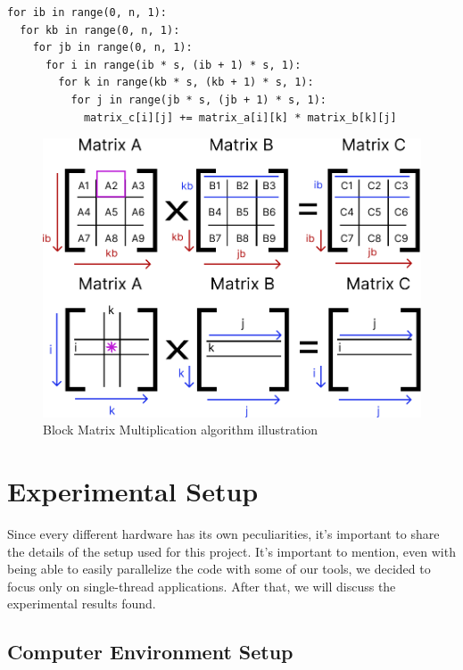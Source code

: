\documentclass[sigconf,balance,nonacm]{acmart}
\begin{document}
\begin{minipage}{\linewidth}
    \begin{lstlisting}
for ib in range(0, n, 1):
  for kb in range(0, n, 1):
    for jb in range(0, n, 1):
      for i in range(ib * s, (ib + 1) * s, 1):
    	for k in range(kb * s, (kb + 1) * s, 1):
          for j in range(jb * s, (jb + 1) * s, 1):
            matrix_c[i][j] += matrix_a[i][k] * matrix_b[k][j]
\end{lstlisting}
\end{minipage}

\begin{figure}[H]
    \centering
    \includegraphics[width=0.8\columnwidth]{figures/block.png}
    \caption{Block Matrix Multiplication algorithm illustration}
    \label{fig:blocks_illustration}
\end{figure}

\section{Experimental Setup}

Since every different hardware has its own peculiarities, it's important to share the details of the setup used for this project. It's important to mention, even with being able to easily parallelize the code with some of our tools, we decided to focus only on single-thread applications. After that, we will discuss the experimental results found.

\subsection{Computer Environment Setup}
\end{document}
